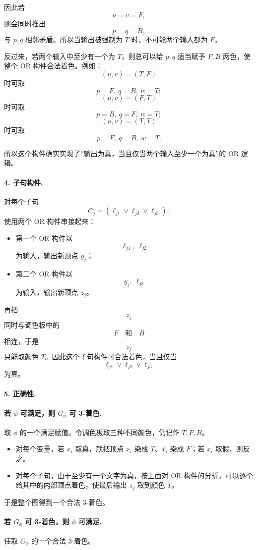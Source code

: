 \begin{answerred}
因此若
\[
u=v=F,
\]
则会同时推出
\[
p=q=B,
\]
与 $p,q$ 相邻矛盾。所以当输出被强制为 $T$ 时，不可能两个输入都为 $F$。

反过来，若两个输入中至少有一个为 $T$，则总可以给 $p,q$ 适当赋予 $F,B$ 两色，使整个 OR 构件合法着色。例如：
\[
(u,v)=(T,F)
\]
时可取
\[
p=F,\ q=B,\ w=T;
\]
\[
(u,v)=(F,T)
\]
时可取
\[
p=B,\ q=F,\ w=T;
\]
\[
(u,v)=(T,T)
\]
时可取
\[
p=F,\ q=B,\ w=T.
\]

所以这个构件确实实现了“输出为真，当且仅当两个输入至少一个为真”的 OR 逻辑。

\paragraph{4. 子句构件.}
对每个子句
\[
C_j=(\ell_{j1}\vee \ell_{j2}\vee \ell_{j3}),
\]
使用两个 OR 构件串接起来：

\begin{itemize}
  \item 第一个 OR 构件以
  \[
  \ell_{j1},\ \ell_{j2}
  \]
  为输入，输出新顶点 $y_j$；
  \item 第二个 OR 构件以
  \[
  y_j,\ \ell_{j3}
  \]
  为输入，输出新顶点 $z_j$。
\end{itemize}

再把
\[
z_j
\]
同时与调色板中的
\[
F\quad\text{和}\quad B
\]
相连，于是
\[
z_j
\]
只能取颜色 $T$。因此这个子句构件可合法着色，当且仅当
\[
\ell_{j1}\vee \ell_{j2}\vee \ell_{j3}
\]
为真。

\paragraph{5. 正确性.}

\paragraph{若 $\phi$ 可满足，则 $G_\phi$ 可 3-着色.}
取 $\phi$ 的一个满足赋值。令调色板取三种不同颜色，仍记作 $T,F,B$。

\begin{itemize}
  \item 对每个变量，若 $x_i$ 取真，就把顶点 $x_i$ 染成 $T$、$\overline{x_i}$ 染成 $F$；若 $x_i$ 取假，则反之。
  \item 对每个子句，由于至少有一个文字为真，按上面对 OR 构件的分析，可以逐个给其中的内部顶点着色，使最后输出 $z_j$ 取到颜色 $T$。
\end{itemize}

于是整个图得到一个合法 3-着色。

\paragraph{若 $G_\phi$ 可 3-着色，则 $\phi$ 可满足.}
任取 $G_\phi$ 的一个合法 3-着色。


\end{answerred}

